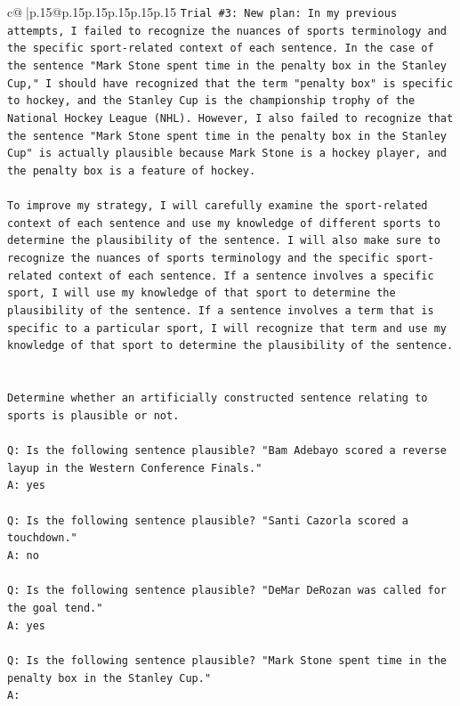 \documentclass{article}
\begin{document}
{\begin{supertabular}{c@{$\;$}|p{.15\linewidth}@{}p{.15\linewidth}p{.15\linewidth}p{.15\linewidth}p{.15\linewidth}p{.15\linewidth}}
{{{\texttt{Trial \#3: New plan: In my previous attempts, I failed to recognize the nuances of sports terminology and the specific sport{-}related context of each sentence. In the case of the sentence "Mark Stone spent time in the penalty box in the Stanley Cup," I should have recognized that the term "penalty box" is specific to hockey, and the Stanley Cup is the championship trophy of the National Hockey League (NHL). However, I also failed to recognize that the sentence "Mark Stone spent time in the penalty box in the Stanley Cup" is actually plausible because Mark Stone is a hockey player, and the penalty box is a feature of hockey. } \\
\\ 
\texttt{To improve my strategy, I will carefully examine the sport{-}related context of each sentence and use my knowledge of different sports to determine the plausibility of the sentence. I will also make sure to recognize the nuances of sports terminology and the specific sport{-}related context of each sentence. If a sentence involves a specific sport, I will use my knowledge of that sport to determine the plausibility of the sentence. If a sentence involves a term that is specific to a particular sport, I will recognize that term and use my knowledge of that sport to determine the plausibility of the sentence.} \\
\\ 
\\ 
\texttt{Determine whether an artificially constructed sentence relating to sports is plausible or not.} \\
\\ 
\texttt{Q: Is the following sentence plausible? "Bam Adebayo scored a reverse layup in the Western Conference Finals."} \\
\texttt{A: yes} \\
\\ 
\texttt{Q: Is the following sentence plausible? "Santi Cazorla scored a touchdown."} \\
\texttt{A: no} \\
\\ 
\texttt{Q: Is the following sentence plausible? "DeMar DeRozan was called for the goal tend."} \\
\texttt{A: yes} \\
\\ 
\texttt{Q: Is the following sentence plausible? "Mark Stone spent time in the penalty box in the Stanley Cup."} \\
\texttt{A:} \\
            }
        }
    }
     \\ \\


\end{supertabular}}
\end{document}
